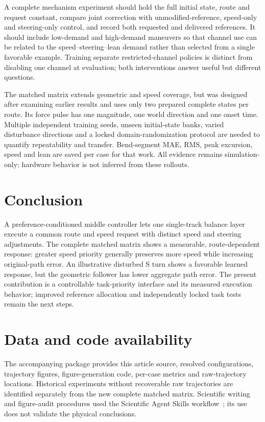 \documentclass[final,5p,times,twocolumn]{elsarticle}
\begin{document}
A complete mechanism experiment should hold the full initial state, route and request constant, compare joint correction with unmodified-reference, speed-only and steering-only control, and record both requested and delivered references. It should include low-demand and high-demand maneuvers so that channel use can be related to the speed--steering--lean demand rather than selected from a single favorable example. Training separate restricted-channel policies is distinct from disabling one channel at evaluation; both interventions answer useful but different questions.

The matched matrix extends geometric and speed coverage, but was designed after examining earlier results and uses only two prepared complete states per route. Its force pulse has one magnitude, one world direction and one onset time. Multiple independent training seeds, unseen initial-state banks, varied disturbance directions and a locked domain-randomization protocol are needed to quantify repeatability and transfer. Bend-segment MAE, RMS, peak excursion, speed and lean are saved per case for that work. All evidence remains simulation-only; hardware behavior is not inferred from these rollouts.

\section{Conclusion}
A preference-conditioned middle controller lets one single-track balance layer execute a common route and speed request with distinct speed and steering adjustments. The complete matched matrix shows a measurable, route-dependent response: greater speed priority generally preserves more speed while increasing original-path error. An illustrative disturbed S turn shows a favorable learned response, but the geometric follower has lower aggregate path error. The present contribution is a controllable task-priority interface and its measured execution behavior; improved reference allocation and independently locked task tests remain the next steps.

\section*{Data and code availability}
The accompanying package provides this article source, resolved configurations, trajectory figures, figure-generation code, per-case metrics and raw-trajectory locations. Historical experiments without recoverable raw trajectories are identified separately from the new complete matched matrix. Scientific writing and figure-audit procedures used the Scientific Agent Skills workflow~\cite{kassis2026}; its use does not validate the physical conclusions.
\end{document}
